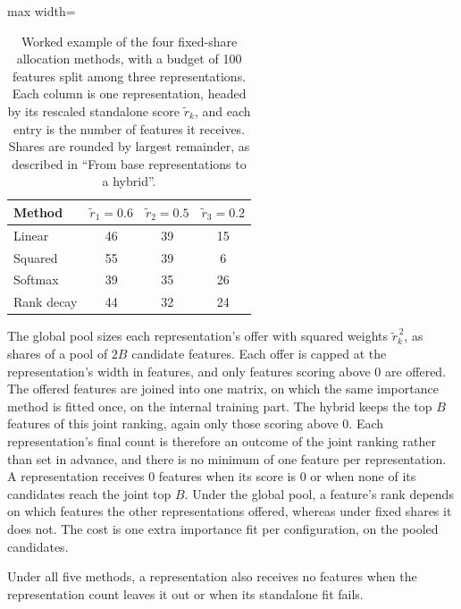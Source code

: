 \begin{table}[htbp]
\centering
\caption[Worked example of the four fixed-share allocation methods.]{Worked example of the four fixed-share allocation methods, with a budget of 100 features split among three representations. Each column is one representation, headed by its rescaled standalone score $\tilde r_k$, and each entry is the number of features it receives. Shares are rounded by largest remainder, as described in ``From base representations to a hybrid''.}
\label{tab:alloc_example}
\begin{adjustbox}{max width=\textwidth}
\begin{tabular}{@{}lccc@{}}
\toprule
Method & $\tilde r_1 = 0.6$ & $\tilde r_2 = 0.5$ & $\tilde r_3 = 0.2$ \\
\midrule
Linear & 46 & 39 & 15 \\
Squared & 55 & 39 & 6 \\
Softmax & 39 & 35 & 26 \\
Rank decay & 44 & 32 & 24 \\
\bottomrule
\end{tabular}
\end{adjustbox}
\end{table}

The global pool sizes each representation's offer with squared weights $\tilde r_k^{\,2}$, as shares of a pool of $2B$ candidate features. Each offer is capped at the representation's width in features, and only features scoring above 0 are offered. The offered features are joined into one matrix, on which the same importance method is fitted once, on the internal training part. The hybrid keeps the top $B$ features of this joint ranking, again only those scoring above 0. Each representation's final count is therefore an outcome of the joint ranking rather than set in advance, and there is no minimum of one feature per representation. A representation receives 0 features when its score is 0 or when none of its candidates reach the joint top $B$. Under the global pool, a feature's rank depends on which features the other representations offered, whereas under fixed shares it does not. The cost is one extra importance fit per configuration, on the pooled candidates.

Under all five methods, a representation also receives no features when the representation count leaves it out or when its standalone fit fails.

